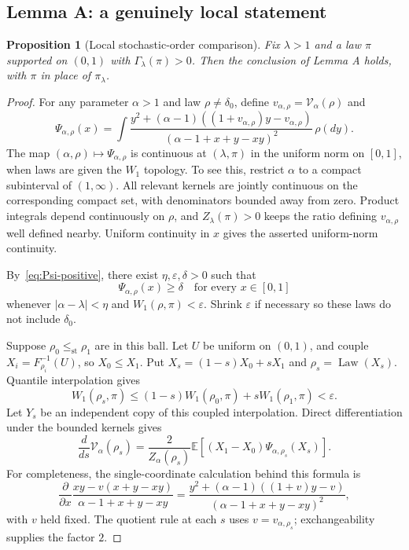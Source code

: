 \documentclass[11pt,a4paper]{article}
\numberwithin{equation}{section}
\theoremstyle{plain}
\newtheorem{proposition}[proposition]{Proposition}
\theoremstyle{definition}
\theoremstyle{remark}
\newcommand{\E}{\mathbb E}
\newcommand{\Law}{\operatorname{Law}}
\newcommand{\st}{\mathrm{st}}
\newcommand{\V}{\mathcal V}
\begin{document}
\subsection{Lemma A: a genuinely local statement}

\begin{proposition}[Local stochastic-order comparison]\label{prop:A}
Fix $\lambda>1$ and a law $\pi$ supported on $(0,1)$ with
$\Gamma_\lambda(\pi)>0$.  Then the conclusion of Lemma A holds, with
$\pi$ in place of $\pi_\lambda$.
\end{proposition}
\begin{proof}
For any parameter $\alpha>1$ and law $\rho\ne\delta_0$, define
$v_{\alpha,\rho}=\V_\alpha(\rho)$ and
\begin{equation}\label{eq:general-Psi}
 \Psi_{\alpha,\rho}(x)
 =\int\frac{y^2+(\alpha-1)((1+v_{\alpha,\rho})y-v_{\alpha,\rho})}
              {(\alpha-1+x+y-xy)^2}\,\rho(dy).
\end{equation}
The map $(\alpha,\rho)\mapsto\Psi_{\alpha,\rho}$ is continuous at
$(\lambda,\pi)$ in the uniform norm on $[0,1]$, when laws are given the
$W_1$ topology.  To see this, restrict $\alpha$ to a compact subinterval
of $(1,\infty)$.  All relevant kernels are jointly continuous on the
corresponding compact set, with denominators bounded away from zero.
Product integrals depend continuously on $\rho$, and $Z_\lambda(\pi)>0$
keeps the ratio defining $v_{\alpha,\rho}$ well defined nearby.  Uniform
continuity in $x$ gives the asserted uniform-norm continuity.

By~\eqref{eq:Psi-positive}, there exist $\eta,\varepsilon,\delta>0$ such
that
\begin{equation}\label{eq:uniform-neighborhood}
 \Psi_{\alpha,\rho}(x)\ge\delta
 \quad\text{for every }x\in[0,1]
\end{equation}
whenever $|\alpha-\lambda|<\eta$ and $W_1(\rho,\pi)<\varepsilon$.
Shrink $\varepsilon$ if necessary so these laws do not include $\delta_0$.

Suppose $\rho_0\le_{\st}\rho_1$ are in this ball.  Let $U$ be uniform
on $(0,1)$, and couple $X_i=F_{\rho_i}^{-1}(U)$, so $X_0\le X_1$.
Put $X_s=(1-s)X_0+sX_1$ and $\rho_s=\Law(X_s)$.  Quantile interpolation
gives
\begin{equation}\label{eq:quantile-ball}
 W_1(\rho_s,\pi)
 \le(1-s)W_1(\rho_0,\pi)+sW_1(\rho_1,\pi)<\varepsilon.
\end{equation}
Let $Y_s$ be an independent copy of this coupled interpolation.  Direct
differentiation under the bounded kernels gives
\begin{equation}\label{eq:Gateaux}
 \frac{d}{ds}\V_\alpha(\rho_s)
 =\frac{2}{Z_\alpha(\rho_s)}
   \E[(X_1-X_0)\Psi_{\alpha,\rho_s}(X_s)].
\end{equation}
For completeness, the single-coordinate calculation behind this formula
is
\begin{equation}\label{eq:single-variation}
 \frac{\partial}{\partial x}
 \frac{xy-v(x+y-xy)}{\alpha-1+x+y-xy}
 =\frac{y^2+(\alpha-1)((1+v)y-v)}
        {(\alpha-1+x+y-xy)^2},
\end{equation}
with $v$ held fixed.  The quotient rule at each $s$ uses
$v=v_{\alpha,\rho_s}$; exchangeability supplies the factor $2$.


\end{proof}
\end{document}

